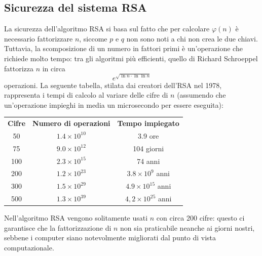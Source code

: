 \documentclass[italian,A4,12pt]{article}
\begin{document}
      \subsection{Sicurezza del sistema RSA}
      La sicurezza dell'algoritmo RSA si basa sul fatto che per calcolare $\varphi(n)$ è necessario fattorizzare $n$, siccome $p$ e $q$ non sono noti a chi non crea le due chiavi.\\
      Tuttavia, la scomposizione di un numero in fattori primi è un'operazione che richiede molto tempo: tra gli algoritmi più efficienti, quello di Richard Schroeppel fattorizza $n$ in circa $$e^{\sqrt{\ln{n}\cdot\ln{\ln{n}}}}$$
      operazioni. La seguente tabella, stilata dai creatori dell'RSA nel 1978, rappresenta i tempi di calcolo al variare delle cifre di $n$ (assumendo che un'operazione impieghi in media un microsecondo per essere eseguita):
      ~\\
      \begin{center}
        \begin{tabular}{c c c}
          \textbf{Cifre}&\textbf{Numero di operazioni}&\textbf{Tempo impiegato}\\
          50&$1.4\times 10^{10}$&3.9 ore\\
          75&$9.0\times 10^{12}$&104 giorni\\
          100&$2.3\times 10^{15}$&74 anni\\
          200&$1.2\times 10^{23}$&$3.8\times 10^9$ anni\\
          300&$1.5\times 10^{29}$&$4.9\times 10^{15}$ anni\\
          500&$1.3\times 10^{39}$&$4,2\times 10^{25}$ anni\\

        \end{tabular}
      \end{center}
      Nell'algoritmo RSA vengono solitamente usati $n$ con circa 200 cifre: questo ci garantisce che la fattorizzazione di $n$ non sia praticabile neanche ai giorni nostri, sebbene i computer siano notevolmente migliorati dal punto di vista computazionale.

      \newpage
\end{document}
